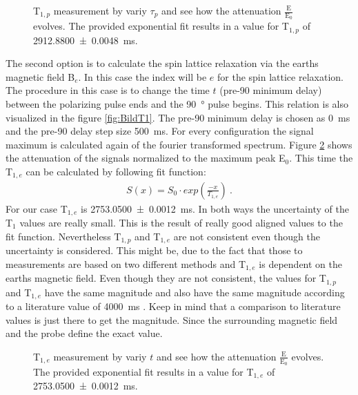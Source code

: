 \begin{figure}[H]
    \centering
    
    \caption[T$_{1,p}$ measurement by variy $\tau_p$ and see how the attenuation $\frac{\text{E}}{\text{E}_0}$ evolves.]{T$_{1,p}$ measurement by variy $\tau_p$ and see how the attenuation $\frac{\text{E}}{\text{E}_0}$ evolves. The provided exponential fit results in a value for T$_{1,p}$ of \SI{2912.8800 \pm 0.0048}{\milli \second}.}
    \label{fig:T1Polarisationsfeldfeld}
\end{figure}

The second option is to calculate the spin lattice relaxation via the earths magnetic field B$_e$. In this case the index will be $e$ for the spin lattice relaxation. The procedure in this case is to change the time $t$ (pre-90 minimum delay) between the polarizing pulse ends and the \SI{90}{\degree} pulse begins. This relation is also visualized in the figure \ref{fig:BildT1}. The pre-90 minimum delay is chosen as \SI{0}{\milli \second} and the pre-90 delay step size \SI{500}{\milli \second}. For every configuration the signal maximum is calculated again of the fourier transformed spectrum. Figure \ref{fig:T1Erdmagnetfeld} shows the attenuation of the signals normalized to the maximum peak E$_0$. This time the T$_{1,e}$ can be calculated by following fit function:
\begin{align}
    S(x) = S_0 \cdot exp(\frac{-x}{T_{1,e}}) \ .
    \label{eq: fitBe}
\end{align}
For our case T$_{1,e}$ is \SI{2753.0500 \pm 0.0012}{\milli \second}.\newline
In both ways the uncertainty of the T$_1$ values are really small. This is the result of really good aligned values to the fit function. Nevertheless T$_{1,p}$ and T$_{1,e}$ are not consistent even though the uncertainty is considered. This might be, due to the fact that those to measurements are based on two different methods and T$_{1,e}$ is dependent on the earths magnetic field. Even though they are not consistent, the values for T$_{1,p}$ and T$_{1,e}$ have the same magnitude and also have the same magnitude according to a literature value of \SI{4000}{\milli \second} \cite{literaturT1}. Keep in mind that a comparison to literature values is just there to get the magnitude. Since the surrounding magnetic field and the probe define the exact value.
\begin{figure}[H]
    \centering
    
    \caption[T$_{1,e}$ measurement by variy $t$ and see how the attenuation $\frac{\text{E}}{\text{E}_0}$ evolves.]{T$_{1,e}$ measurement by variy $t$ and see how the attenuation $\frac{\text{E}}{\text{E}_0}$ evolves. The provided exponential fit results in a value for T$_{1,e}$ of \SI{2753.0500 \pm 0.0012}{\milli \second}.}
    \label{fig:T1Erdmagnetfeld}
\end{figure}

